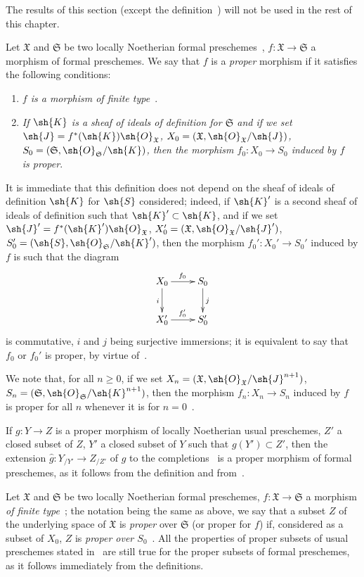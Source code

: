 The results of this section (except the definition~) will not be used in the rest of this chapter.

\begin{env}[3.4.1]
\label{III.3.4.1}
Let $\mathfrak{X}$ and $\mathfrak{S}$ be two locally Noetherian formal preschemes~, $f:\mathfrak{X}\to\mathfrak{S}$ a morphism of formal preschemes.
We say that $f$ is a \emph{proper} morphism if it satisfies the following conditions:
\begin{enumerate}
  \item[1st.] \emph{$f$ is a morphism of finite type~}.
  \item[2nd.] \emph{If $\sh{K}$ is a sheaf of ideals of definition for $\mathfrak{S}$ and if we set $\sh{J}=f^*(\sh{K})\sh{O}_\mathfrak{X}$, $X_0=(\mathfrak{X},\sh{O}_\mathfrak{X}/\sh{J})$, $S_0=(\mathfrak{S},\sh{O}_\mathfrak{S}/\sh{K})$, then the morphism $f_0:X_0\to S_0$ induced by $f$~ is proper}.
\end{enumerate}
It is immediate that this definition does not depend on the sheaf of ideals of definition $\sh{K}$ for $\sh{S}$ considered; indeed, if $\sh{K}'$ is a second sheaf of ideals of definition such that $\sh{K}'\subset\sh{K}$, and if we set $\sh{J}'=f^*(\sh{K}')\sh{O}_\mathfrak{X}$, $X_0'=(\mathfrak{X},\sh{O}_\mathfrak{X}/\sh{J}')$, $S_0'=(\sh{S},\sh{O}_\mathfrak{S}/\sh{K}')$, then the morphism $f_0':X_0'\to S_0'$ induced by $f$ is such that the diagram
\[
  \xymatrix{
    X_0\ar[r]^{f_0}\ar[d]_i &
    S_0\ar[d]^j\\
    X_0'\ar[r]^{f_0'} &
    S_0'
  }
\]
is commutative, $i$ and $j$ being surjective immersions; it is equivalent to say that $f_0$ or $f_0'$ is proper, by virtue of~.

We note that, for all $n\geq 0$, if we set $X_n=(\mathfrak{X},\sh{O}_\mathfrak{X}/\sh{J}^{n+1})$, $S_n=(\mathfrak{S},\sh{O}_\mathfrak{S}/\sh{K}^{n+1})$, then the morphism $f_n:X_n\to S_n$ induced by $f$~ is proper for all $n$ whenever it is for $n=0$~.

If $g:Y\to Z$ is a proper morphism of locally Noetherian usual preschemes, $Z'$ a closed subset of $Z$, $Y'$ a closed subset of $Y$ such that $g(Y')\subset Z'$, then the extension $\widehat{g}:Y_{/Y'}\to Z_{/Z'}$ of $g$ to the completions~ is a proper morphism of formal preschemes, as it follows from the definition and from~.

Let $\mathfrak{X}$ and $\mathfrak{S}$ be two locally Noetherian formal preschemes, $f:\mathfrak{X}\to\mathfrak{S}$ a morphism \emph{of finite type}~; the notation being the same as above, we say that a subset $Z$ of the underlying space of $\mathfrak{X}$ is \emph{proper} over $\mathfrak{S}$ (or proper for $f$) if, considered as a subset of $X_0$, $Z$ is \emph{proper over $S_0$}~.
All the properties of proper subsets of usual preschemes stated in~ are still true for the proper subsets of formal preschemes, as it follows immediately from the definitions.
\end{env}

